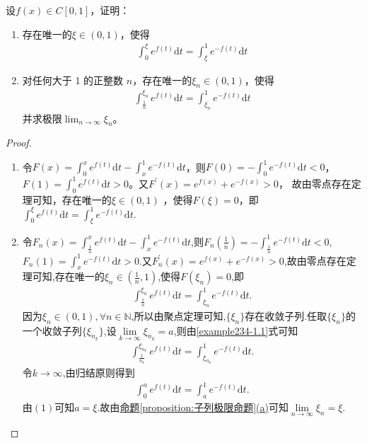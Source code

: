 \documentclass[../../main.tex]{subfiles}
\begin{document}
\begin{example}
设$f(x)\in C[0,1]$，证明：
\begin{enumerate}[(1)]
\item 存在唯一的$\xi\in(0,1)$，使得
\begin{align*}
\int_{0}^{\xi}e^{f(t)}\mathrm{d}t=\int_{\xi}^{1}e^{-f(t)}\mathrm{d}t
\end{align*}

\item 对任何大于 1 的正整数 $n$，存在唯一的$\xi_n\in(0,1)$，使得
\begin{align*}
\int_{\frac{1}{n}}^{\xi_n}e^{f(t)}\mathrm{d}t=\int_{\xi_n}^{1}e^{-f(t)}\mathrm{d}t
\end{align*}
并求极限$\lim_{n \to \infty}\xi_n$。
\end{enumerate}
\end{example}
\begin{proof}
\begin{enumerate}[(1)]
\item 令$F(x) = \int_0^x e^{f(t)} \mathrm{d}t - \int_x^1 e^{-f(t)} \mathrm{d}t$，则$F(0) = -\int_0^1 e^{-f(t)} \mathrm{d}t < 0$，$F(1) = \int_0^1 e^{f(t)} \mathrm{d}t > 0$。又$F^\prime(x) = e^{f(x)} + e^{-f(x)} > 0$，
故由零点存在定理可知，存在唯一的$\xi \in (0,1)$ ，使得$F(\xi) = 0$，即$\int_0^{\xi} e^{f(t)} \mathrm{d}t = \int_{\xi}^1 e^{-f(t)} \mathrm{d}t$.

\item 令$F_n(x)=\int_{\frac{1}{n}}^x{e^{f(t)}\mathrm{d}t}-\int_x^1{e^{-f(t)}\mathrm{d}t}$,则$F_n\left(\frac{1}{n}\right)=-\int_{\frac{1}{n}}^1{e^{-f(t)}\mathrm{d}t}<0$,$F_n(1)=\int_x^1{e^{-f(t)}\mathrm{d}t}>0$.又$F_{n}^{\prime}(x)=e^{f(x)}+e^{-f(x)}>0$,故由零点存在定理可知,存在唯一的$\xi_n\in\left(\frac{1}{n},1\right)$,使得$F(\xi_n)=0$,即
\begin{align}
\int_{\frac{1}{n}}^{\xi_n}{e^{f(t)}\mathrm{d}t}=\int_{\xi_n}^1{e^{-f(t)}\mathrm{d}t}.\label{example234-1.1}
\end{align}
因为$\xi_n\in(0,1),\forall n\in\mathbb{N}$,所以由聚点定理可知,$\{\xi_n\}$存在收敛子列.任取$\{\xi_n\}$的一个收敛子列$\{\xi_{n_k}\}$,设$\underset{k\rightarrow\infty}{\lim}\xi_{n_k}=a$,则由\eqref{example234-1.1}式可知
\begin{align*}
\int_{\frac{1}{n_k}}^{\xi_{n_k}}{e^{f(t)}\mathrm{d}t}=\int_{\xi_{n_k}}^1{e^{-f(t)}\mathrm{d}t}.
\end{align*}
令$k\rightarrow\infty$,由归结原则得到
\begin{align*}
\int_0^a{e^{f(t)}\mathrm{d}t}=\int_a^1{e^{-f(t)}\mathrm{d}t}.
\end{align*}
由$(1)$可知$a=\xi$.故由\hyperref[proposition:子列极限命题]{命题\ref{proposition:子列极限命题}(a)}可知$\underset{n\rightarrow\infty}{\lim}\xi_n=\xi$.
\end{enumerate}

\end{proof}
\end{document}
